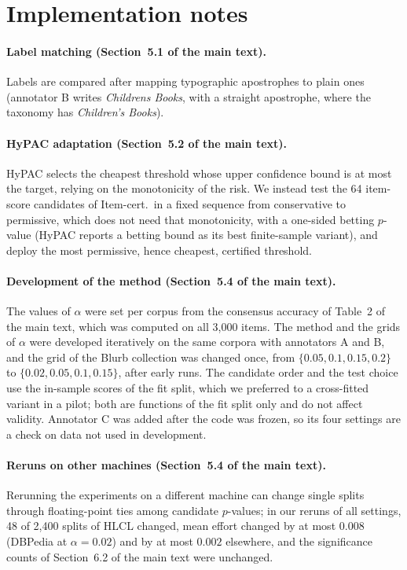 \documentclass[11pt]{article}
\newcommand{\hlcl}{\textup{\textsc{HLCL}}}
\begin{document}
\section*{Implementation notes}

\paragraph{Label matching (Section~5.1 of the main text).} Labels are compared
after mapping typographic apostrophes to plain ones (annotator B writes
\emph{Children\textquotesingle s Books}, with a straight apostrophe, where the
taxonomy has \emph{Children\textquoteright s Books}).

\paragraph{HyPAC adaptation (Section~5.2 of the main text).} HyPAC selects the
cheapest threshold whose upper confidence bound is at most the target, relying
on the monotonicity of the risk. We instead test the 64 item-score candidates
of Item-cert.\ in a fixed sequence from conservative to permissive, which does
not need that monotonicity, with a one-sided betting $p$-value (HyPAC reports a
betting bound as its best finite-sample variant), and deploy the most
permissive, hence cheapest, certified threshold.

\paragraph{Development of the method (Section~5.4 of the main text).} The
values of $\alpha$ were set per corpus from the consensus accuracy of Table~2
of the main text, which was computed on all 3,000 items. The method and the
grids of $\alpha$ were developed iteratively on the same corpora with
annotators A and B, and the grid of the Blurb collection was changed once, from
$\{0.05,0.1,0.15,0.2\}$ to $\{0.02,0.05,0.1,0.15\}$, after early runs. The
candidate order and the test choice use the in-sample scores of the fit split,
which we preferred to a cross-fitted variant in a pilot; both are functions of
the fit split only and do not affect validity. Annotator C was added after the
code was frozen, so its four settings are a check on data not used in
development.

\paragraph{Reruns on other machines (Section~5.4 of the main text).} Rerunning
the experiments on a different machine can change single splits through
floating-point ties among candidate $p$-values; in our reruns of all
 settings, 48 of 2,400 splits of \hlcl{} changed, mean effort
changed by at most $0.008$ (DBPedia at $\alpha=0.02$) and by at most $0.002$
elsewhere, and the significance counts of Section~6.2 of the main text were
unchanged.
\end{document}
